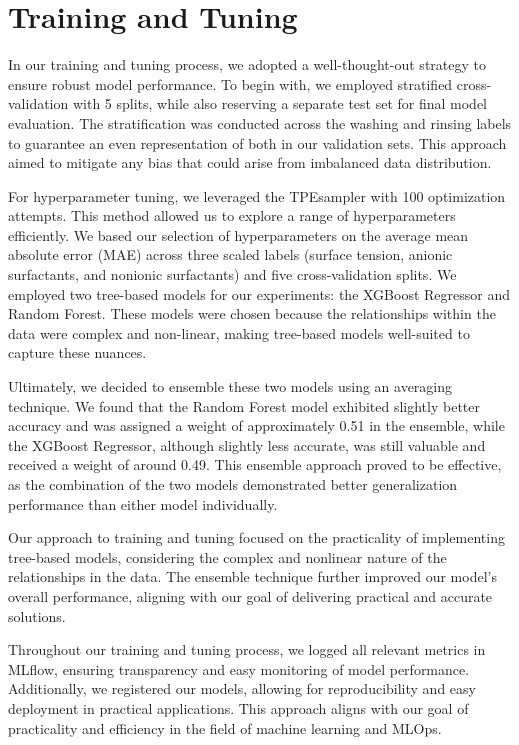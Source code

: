\documentclass{report}
\begin{document}
\section{Training and Tuning}
In our training and tuning process, we adopted a well-thought-out strategy to ensure robust model performance. To begin with, we employed stratified cross-validation with 5 splits, while also reserving a separate test set for final model evaluation. The stratification was conducted across the washing and rinsing labels to guarantee an even representation of both in our validation sets. This approach aimed to mitigate any bias that could arise from imbalanced data distribution.

For hyperparameter tuning, we leveraged the TPEsampler with 100 optimization attempts. This method allowed us to explore a range of hyperparameters efficiently. We based our selection of hyperparameters on the average mean absolute error (MAE) across three scaled labels (surface tension, anionic surfactants, and nonionic surfactants) and five cross-validation splits. We employed two tree-based models for our experiments: the XGBoost Regressor and Random Forest. These models were chosen because the relationships within the data were complex and non-linear, making tree-based models well-suited to capture these nuances.

Ultimately, we decided to ensemble these two models using an averaging technique. We found that the Random Forest model exhibited slightly better accuracy and was assigned a weight of approximately 0.51 in the ensemble, while the XGBoost Regressor, although slightly less accurate, was still valuable and received a weight of around 0.49. This ensemble approach proved to be effective, as the combination of the two models demonstrated better generalization performance than either model individually.

Our approach to training and tuning focused on the practicality of implementing tree-based models, considering the complex and nonlinear nature of the relationships in the data. The ensemble technique further improved our model's overall performance, aligning with our goal of delivering practical and accurate solutions.

Throughout our training and tuning process, we logged all relevant metrics in MLflow, ensuring transparency and easy monitoring of model performance. Additionally, we registered our models, allowing for reproducibility and easy deployment in practical applications. This approach aligns with our goal of practicality and efficiency in the field of machine learning and MLOps.
\end{document}
